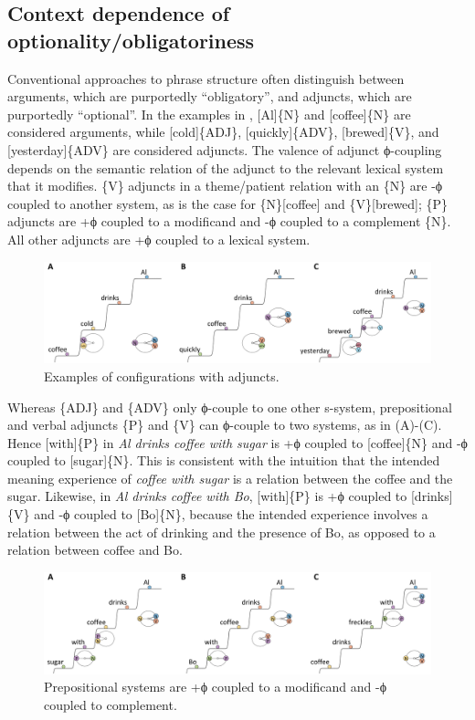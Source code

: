 \subsection{Context dependence of optionality/obligatoriness}

Conventional approaches to phrase structure often distinguish between arguments, which are purportedly “obligatory”, and adjuncts, which are purportedly “optional”. In the examples in {}, [Al]\{N\} and [coffee]\{N\} are considered arguments, while [cold]\{ADJ\}, [quickly]\{ADV\}, [brewed]\{V\}, and [yesterday]\{ADV\} are considered adjuncts. The valence of adjunct ϕ-coupling depends on the semantic relation of the adjunct to the relevant lexical system that it modifies. \{V\} adjuncts in a theme/patient relation with an \{N\} are -ϕ coupled to another system, as is the case for \{N\}[coffee] and \{V\}[brewed]; \{P\} adjuncts are +ϕ coupled to a modificand and -ϕ coupled to a complement \{N\}. All other adjuncts are +ϕ coupled to a lexical system.

  
\begin{figure}
\includegraphics[width=\textwidth]{figures/Tilsen-img83.png}
\caption{Examples of configurations with adjuncts.}
\label{fig:4:33}
\end{figure}
 

  Whereas \{ADJ\} and \{ADV\} only ϕ-couple to one other s-system, prepositional and verbal adjuncts \{P\} and \{V\} can ϕ-couple to two systems, as in {}(A)-(C). Hence [with]\{P\} in \textit{Al drinks coffee with sugar} is +ϕ coupled to [coffee]\{N\} and -ϕ coupled to [sugar]\{N\}. This is consistent with the intuition that the intended meaning experience of \textit{coffee with sugar} is a relation between the coffee and the sugar. Likewise, in \textit{Al drinks coffee with Bo}, [with]\{P\} is +ϕ coupled to [drinks]\{V\} and -ϕ coupled to [Bo]\{N\}, because the intended experience involves a relation between the act of drinking and the presence of Bo, as opposed to a relation between coffee and Bo.

  
\begin{figure}
\includegraphics[width=\textwidth]{figures/Tilsen-img84.png}
\caption{Prepositional systems are +ϕ coupled to a modificand and -ϕ coupled to complement.}
\label{fig:4:34}
\end{figure}
 

